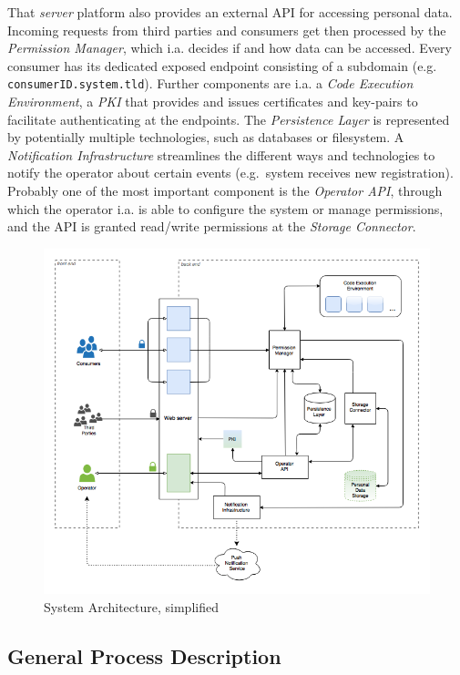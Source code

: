 \documentclass[12pt,english,a4paper,titlepage,cleardoublepage=empty,dottedtoc]{report}
\begin{document}
That \emph{server} platform also provides an external API for accessing
personal data. Incoming requests from third parties and consumers get
then processed by the \emph{Permission Manager}, which i.a. decides if
and how data can be accessed. Every consumer has its dedicated exposed
endpoint consisting of a subdomain (e.g.
\texttt{consumerID.system.tld}). Further components are i.a. a
\emph{Code Execution Environment}, a \emph{PKI} that provides and issues
certificates and key-pairs to facilitate authenticating at the
endpoints. The \emph{Persistence Layer} is represented by potentially
multiple technologies, such as databases or filesystem. A
\emph{Notification Infrastructure} streamlines the different ways and
technologies to notify the operator about certain events (e.g.~system
receives new registration). Probably one of the most important component
is the \emph{Operator API}, through which the operator i.a. is able to
configure the system or manage permissions, and the API is granted
read/write permissions at the \emph{Storage Connector}.

\begin{figure}
\centering
\includegraphics[width=12.00000cm]{./assets/figures/spec_arch_simplifierd.png}
\caption{System Architecture,
simplified\label{fig:spec_arch_simplifier}}
\end{figure}

\subsection*{General Process
Description}\label{general-process-description}
\end{document}
